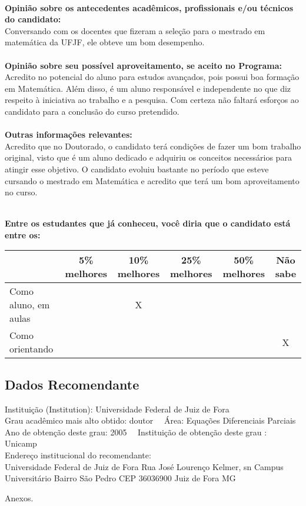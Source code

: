 \documentclass[11pt]{article}
\begin{document}
\\
\textbf{Opinião sobre os antecedentes acadêmicos, profissionais e/ou técnicos do candidato:}
\\Conversando com os docentes que fizeram a seleção para o mestrado em matemática da UFJF, ele obteve um bom desempenho.\\
\\
\textbf{Opinião sobre seu possível aproveitamento, se aceito no Programa:}
\\Acredito no potencial do aluno para estudos avançados, pois possui boa formação em Matemática. Além disso, é um aluno responsável e independente no que diz respeito à iniciativa ao trabalho e a pesquisa.
Com certeza não faltará esforços ao candidato para a conclusão do curso pretendido.\\ 
\\
\textbf{Outras informações relevantes:} \\Acredito que no Doutorado, o candidato terá condições de fazer um bom trabalho original, visto que é um aluno dedicado e adquiriu os conceitos necessários para atingir esse objetivo.
O candidato evoluiu bastante no período que esteve cursando o mestrado em Matemática e acredito que terá um bom aproveitamento no curso.

\\[0.3cm]
\textbf{Entre os estudantes que já conheceu, você diria que o candidato está entre os:}
\\
\begin{tabular}{|l|c|c|c|c|c|}
\hline
 & 5\% melhores & 10\% melhores & 25\% melhores & 50\% melhores & Não sabe \\
\hline
Como aluno, em aulas &  & X &  &  & \\
\hline
Como orientando &  &  &  &  & X\\
\hline
\end{tabular}
\subsection*{Dados Recomendante} 
	Instituição (Institution): Universidade Federal de Juiz de Fora
\\ 
	Grau acadêmico mais alto obtido: doutor
	\ \ Área: Equações Diferenciais Parciais
	\\
	Ano de obtenção deste grau: 2005
	\ \ 
	Instituição de obtenção deste grau : Unicamp
	\\ 
	Endereço institucional do recomendante: \\ Universidade Federal de Juiz de Fora
Rua José Lourenço Kelmer, sn  Campus Universitário 
Bairro São Pedro  CEP 36036900  Juiz de Fora  MG
 
\begin{center}
Anexos.
\end{center}
\end{document}
